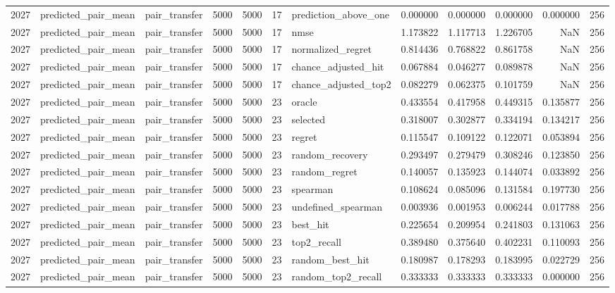 \begin{tabular}{rllrrrlrrrrr}
2027 & predicted_pair_mean & pair_transfer & 5000 & 5000 & 17 & prediction_above_one & 0.000000 & 0.000000 & 0.000000 & 0.000000 & 256 \\
2027 & predicted_pair_mean & pair_transfer & 5000 & 5000 & 17 & nmse & 1.173822 & 1.117713 & 1.226705 & NaN & 256 \\
2027 & predicted_pair_mean & pair_transfer & 5000 & 5000 & 17 & normalized_regret & 0.814436 & 0.768822 & 0.861758 & NaN & 256 \\
2027 & predicted_pair_mean & pair_transfer & 5000 & 5000 & 17 & chance_adjusted_hit & 0.067884 & 0.046277 & 0.089878 & NaN & 256 \\
2027 & predicted_pair_mean & pair_transfer & 5000 & 5000 & 17 & chance_adjusted_top2 & 0.082279 & 0.062375 & 0.101759 & NaN & 256 \\
2027 & predicted_pair_mean & pair_transfer & 5000 & 5000 & 23 & oracle & 0.433554 & 0.417958 & 0.449315 & 0.135877 & 256 \\
2027 & predicted_pair_mean & pair_transfer & 5000 & 5000 & 23 & selected & 0.318007 & 0.302877 & 0.334194 & 0.134217 & 256 \\
2027 & predicted_pair_mean & pair_transfer & 5000 & 5000 & 23 & regret & 0.115547 & 0.109122 & 0.122071 & 0.053894 & 256 \\
2027 & predicted_pair_mean & pair_transfer & 5000 & 5000 & 23 & random_recovery & 0.293497 & 0.279479 & 0.308246 & 0.123850 & 256 \\
2027 & predicted_pair_mean & pair_transfer & 5000 & 5000 & 23 & random_regret & 0.140057 & 0.135923 & 0.144074 & 0.033892 & 256 \\
2027 & predicted_pair_mean & pair_transfer & 5000 & 5000 & 23 & spearman & 0.108624 & 0.085096 & 0.131584 & 0.197730 & 256 \\
2027 & predicted_pair_mean & pair_transfer & 5000 & 5000 & 23 & undefined_spearman & 0.003936 & 0.001953 & 0.006244 & 0.017788 & 256 \\
2027 & predicted_pair_mean & pair_transfer & 5000 & 5000 & 23 & best_hit & 0.225654 & 0.209954 & 0.241803 & 0.131063 & 256 \\
2027 & predicted_pair_mean & pair_transfer & 5000 & 5000 & 23 & top2_recall & 0.389480 & 0.375640 & 0.402231 & 0.110093 & 256 \\
2027 & predicted_pair_mean & pair_transfer & 5000 & 5000 & 23 & random_best_hit & 0.180987 & 0.178293 & 0.183995 & 0.022729 & 256 \\
2027 & predicted_pair_mean & pair_transfer & 5000 & 5000 & 23 & random_top2_recall & 0.333333 & 0.333333 & 0.333333 & 0.000000 & 256 \\

\end{tabular}
